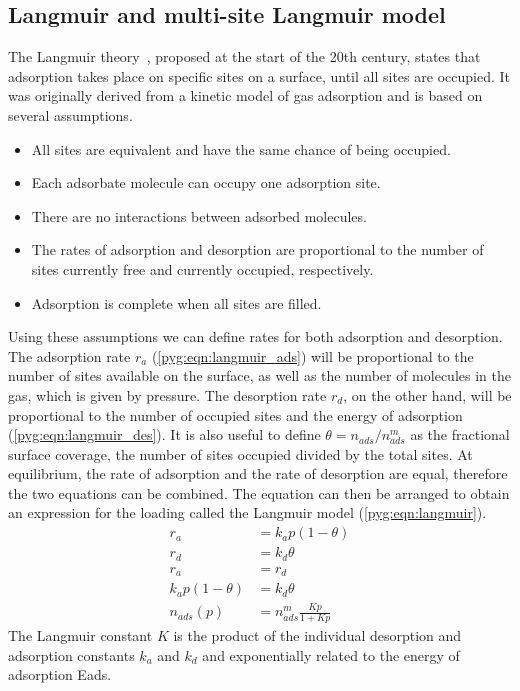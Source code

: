 \subsection{Langmuir and multi-site Langmuir
	model}\label{pyg:models:langmuir}

The Langmuir theory~\cite{langmuirAdsorptionGasesPlane1918},
proposed at the start of the 20th century, states that
adsorption takes place on specific sites on a surface, until
all sites are occupied.
It was originally derived from a kinetic model of gas adsorption and
is based on several assumptions.

\begin{itemize}

	\item All sites are equivalent and have the same chance of
	      being occupied.
	\item Each adsorbate molecule can occupy one adsorption site.
	\item There are no interactions between adsorbed molecules.
	\item The rates of adsorption and desorption are proportional
	      to the number of sites currently free and currently occupied,
	      respectively.
	\item Adsorption is complete when all sites are filled.

\end{itemize}

Using these assumptions we can define rates for both adsorption and
desorption. The adsorption rate \(r_a\) (\autoref{pyg:eqn:langmuir_ads})
will be proportional to the number of sites available on the surface,
as well as the number of molecules in the gas, which is given by
pressure.
The desorption rate \(r_d\), on the other hand, will be proportional to the
number of occupied sites and the energy of adsorption
(\autoref{pyg:eqn:langmuir_des}).
It is also useful to define \(\theta = n_{ads}/n_{ads}^m\) as the fractional
surface coverage, the number of sites occupied divided by the total 
sites. At equilibrium, the rate of adsorption and the rate of
desorption are equal, therefore the two equations can be combined.
The equation can then be arranged to obtain an expression for the
loading called the Langmuir model (\autoref{pyg:eqn:langmuir}).
%
\begin{align}
	r_a                & = k_a p (1 - \theta) \label{pyg:eqn:langmuir_ads} \\
	r_d                & = k_d \theta \label{pyg:eqn:langmuir_des} \\
	r_a                & = r_d                                             \\
	k_a p (1 - \theta) & = k_d \theta \\
	n_{ads}(p)             & = n_{ads}^m \frac{Kp}{1+Kp} \label{pyg:eqn:langmuir}
\end{align}
%
The Langmuir constant \(K\) is the product of the individual
desorption and adsorption constants \(k_a\) and \(k_d\) and exponentially
related to the energy of adsorption \gls{Eads}.

